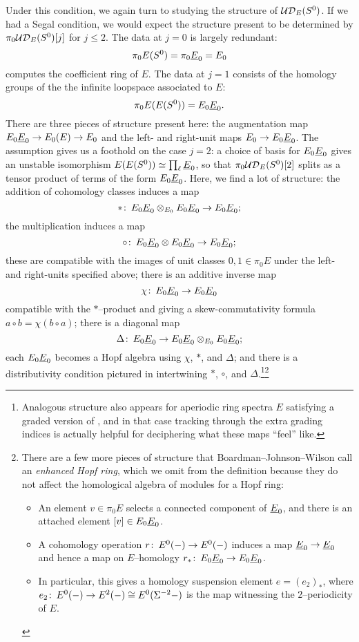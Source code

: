 Under this condition, we again turn to studying the structure of $\mathcal{UD}_E(S^0)$.  If we had a Segal condition, we would expect the structure present to be determined by $\pi_0 \mathcal{UD}_E(S^0)[j]$ for $j \le 2$.  The data at $j = 0$ is largely redundant: \[\pi_0 E(S^0) = \pi_0 \underline{\smash{E}}_{0} = E_0\] computes the coefficient ring of $E$.  The data at $j = 1$ consists of the homology groups of the the infinite loopspace associated to $E$: \[\pi_0 E(E(S^0)) = E_0 \underline{\smash{E}}_{0}.\]  There are three pieces of structure present here: the augmentation map $E_0 \underline{\smash{E}}_{0} \to E_0(E) \to E_0$ and the left- and right-unit maps $E_0 \to E_0 \underline{\smash{E}}_{0}$.  The assumption {\UFH} gives us a foothold on the case $j = 2$: a choice of basis for $E_0 \underline{\smash{E}}_{0}$ gives an unstable isomorphism $E(E(S^0)) \simeq \prod_\ell \underline{\smash{E}}_{0}$, so that $\pi_0 \mathcal{UD}_E(S^0)[2]$ splits as a tensor product of terms of the form $E_0 \underline{\smash{E}}_{0}$.  Here, we find a lot of structure: the addition of cohomology classes induces a map \[\ast\colon\thinspace E_0 \underline{\smash{E}}_{0} \otimes_{E_0} E_0 \underline{\smash{E}}_{0} \to E_0 \underline{\smash{E}}_{0};\] the multiplication induces a map \[\circ\colon\thinspace E_0 \underline{\smash{E}}_{0} \otimes E_0 \underline{\smash{E}}_{0} \to E_0 \underline{\smash{E}}_{0};\] these are compatible with the images of unit classes $0, 1 \in \pi_0 E$ under the left- and right-units specified above; there is an additive inverse map \[\chi\colon\thinspace E_0 \underline{\smash{E}}_{0} \to E_0 \underline{\smash{E}}_{0}\] compatible with the $\ast$--product and giving a skew-commutativity formula $a \circ b = \chi(b \circ a)$; there is a diagonal map \[\Delta\colon\thinspace E_0 \underline{\smash{E}}_{0} \to E_0 \underline{\smash{E}}_{0} \otimes_{E_0} E_0 \underline{\smash{E}}_{0};\] each $E_0 \underline{\smash{E}}_{0}$ becomes a Hopf algebra using $\chi$, $\ast$, and $\Delta$; and there is a distributivity condition pictured in  intertwining $\ast$, $\circ$, and $\Delta$.\footnote{Analogous structure also appears for aperiodic ring spectra $E$ satisfying a graded version of {\UFH}, and in that case tracking through the extra grading indices is actually helpful for deciphering what these maps ``feel'' like.}\footnote{There are a few more pieces of structure that Boardman--Johnson--Wilson call an \textit{enhanced Hopf ring}, which we omit from the definition because they do not affect the homological algebra of modules for a Hopf ring:
\begin{itemize}
\item An element $v \in \pi_0 E$ selects a connected component of $\underline{\smash{E}}_{0}$, and there is an attached element $[v] \in E_0 \underline{\smash{E}}_{0}$.
\item A cohomology operation $r\colon\thinspace E^0(-) \to E^0(-)$ induces a map $\underline{\smash{E}}_{0} \to \underline{\smash{E}}_{0}$ and hence a map on $E$--homology $r_*\colon\thinspace E_0 \underline{\smash{E}}_{0} \to E_0 \underline{\smash{E}}_{0}$.
\item In particular, this gives a homology suspension element $e = (e_2)_*$, where $e_2\colon\thinspace E^0(-) \to E^2(-) \cong E^0(\Sigma^{-2} -)$ is the map witnessing the $2$--periodicity of $E$.
\end{itemize}}

